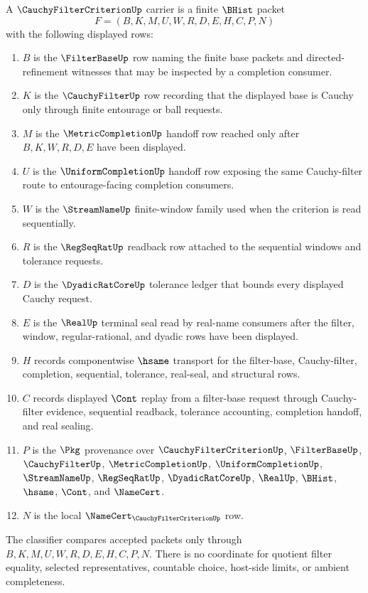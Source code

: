 \begin{definition}
\label{def:cauchy-filter-criterion-carrier}
A $\CauchyFilterCriterionUp$ carrier is a finite $\BHist$ packet
$$
F=(B,K,M,U,W,R,D,E,H,C,P,N)
$$
with the following displayed rows:
\begin{enumerate}
\item $B$ is the $\FilterBaseUp$ row naming the finite base packets and directed-refinement witnesses that may be inspected by a completion consumer.
\item $K$ is the $\CauchyFilterUp$ row recording that the displayed base is Cauchy only through finite entourage or ball requests.
\item $M$ is the $\MetricCompletionUp$ handoff row reached only after $B,K,W,R,D,E$ have been displayed.
\item $U$ is the $\UniformCompletionUp$ handoff row exposing the same Cauchy-filter route to entourage-facing completion consumers.
\item $W$ is the $\StreamNameUp$ finite-window family used when the criterion is read sequentially.
\item $R$ is the $\RegSeqRatUp$ readback row attached to the sequential windows and tolerance requests.
\item $D$ is the $\DyadicRatCoreUp$ tolerance ledger that bounds every displayed Cauchy request.
\item $E$ is the $\RealUp$ terminal seal read by real-name consumers after the filter, window, regular-rational, and dyadic rows have been displayed.
\item $H$ records componentwise $\hsame$ transport for the filter-base, Cauchy-filter, completion, sequential, tolerance, real-seal, and structural rows.
\item $C$ records displayed $\Cont$ replay from a filter-base request through Cauchy-filter evidence, sequential readback, tolerance accounting, completion handoff, and real sealing.
\item $P$ is the $\Pkg$ provenance over $\CauchyFilterCriterionUp$, $\FilterBaseUp$, $\CauchyFilterUp$, $\MetricCompletionUp$, $\UniformCompletionUp$, $\StreamNameUp$, $\RegSeqRatUp$, $\DyadicRatCoreUp$, $\RealUp$, $\BHist$, $\hsame$, $\Cont$, and $\NameCert$.
\item $N$ is the local $\NameCert_{\CauchyFilterCriterionUp}$ row.
\end{enumerate}
The classifier compares accepted packets only through $B,K,M,U,W,R,D,E,H,C,P,N$. There is no coordinate for quotient filter equality, selected representatives, countable choice, host-side limits, or ambient completeness.
\end{definition}

